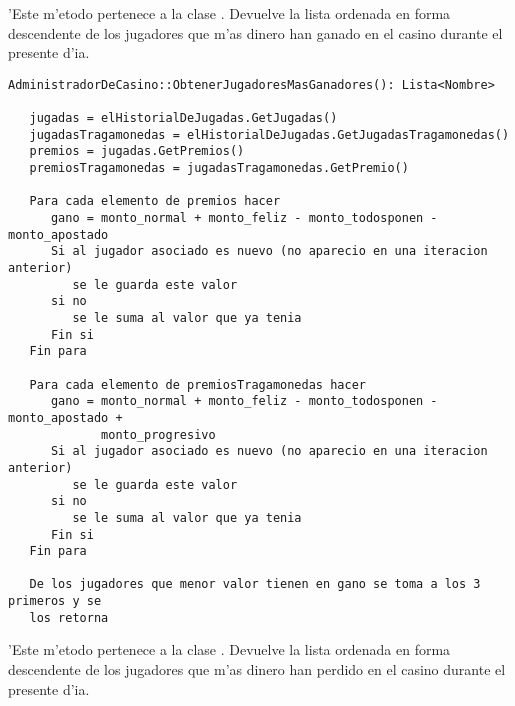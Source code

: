 
'Este m'etodo pertenece a la clase . Devuelve la lista ordenada en forma descendente de los jugadores que m'as dinero han ganado en el casino durante el presente d'ia.

\begin{verbatim}
AdministradorDeCasino::ObtenerJugadoresMasGanadores(): Lista<Nombre>
	
   jugadas = elHistorialDeJugadas.GetJugadas()
   jugadasTragamonedas = elHistorialDeJugadas.GetJugadasTragamonedas()
   premios = jugadas.GetPremios()
   premiosTragamonedas = jugadasTragamonedas.GetPremio()

   Para cada elemento de premios hacer
      gano = monto_normal + monto_feliz - monto_todosponen - monto_apostado
      Si al jugador asociado es nuevo (no aparecio en una iteracion anterior)
         se le guarda este valor
      si no
         se le suma al valor que ya tenia
      Fin si
   Fin para

   Para cada elemento de premiosTragamonedas hacer
      gano = monto_normal + monto_feliz - monto_todosponen - monto_apostado +
             monto_progresivo
      Si al jugador asociado es nuevo (no aparecio en una iteracion anterior)
         se le guarda este valor
      si no
         se le suma al valor que ya tenia
      Fin si
   Fin para

   De los jugadores que menor valor tienen en gano se toma a los 3 primeros y se
   los retorna
\end{verbatim}



'Este m'etodo pertenece a la clase . Devuelve la lista ordenada en forma descendente de los jugadores que m'as dinero han perdido en el casino durante el presente d'ia.

